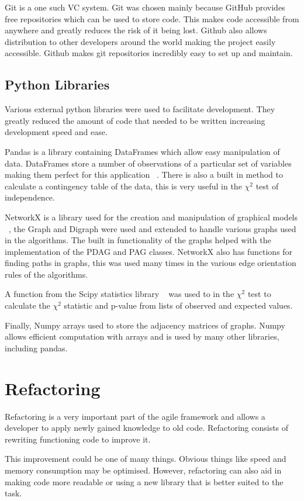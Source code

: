 \documentclass{UoYCSproject}
\begin{document}
Git is a one such VC system. Git was chosen mainly because GitHub provides free repositories which can be used to store code. This makes code accessible from anywhere and greatly reduces the risk of it being lost. Github also allows distribution to other developers around the world making the project easily accessible. Github makes git repositories incredibly easy to set up and maintain. 

\subsection{Python Libraries}
Various external python libraries were used to facilitate development. They greatly reduced the amount of code that needed to be written increasing development speed and ease.

Pandas is a library containing DataFrames which allow easy manipulation of data. DataFrames store a number of observations of a particular set of variables making them perfect for this application ~\parencite{pandas}. There is also a built in method to calculate a contingency table of the data, this is very useful in the $\chi^2$ test of independence.

NetworkX is a library used for the creation and manipulation of graphical models ~\parencite{networkx}, the Graph and Digraph were used and extended to handle various graphs used in the algorithms. The built in functionality of the graphs helped with the implementation of the PDAG and PAG classes. NetworkX also has functions for finding paths in graphs, this was used many times in the various edge orientation rules of the algorithms.

A function from the Scipy statistics library ~\parencite{scipy} was used to in the $\chi^2$ test to calculate the $\chi^2$ statistic and p-value from lists of observed and expected values.

Finally, Numpy arrays used to store the adjacency matrices of graphs. Numpy allows efficient computation with arrays and is used by many other libraries, including pandas. ~\parencite{numpy}  

\section{Refactoring}
Refactoring is a very important part of the agile framework and allows a developer to apply newly gained knowledge to old code. Refactoring consists of rewriting functioning code to improve it.

This improvement could be one of many things. Obvious things like speed and memory consumption may be optimised. However, refactoring can also aid in making code more readable or using a new library that is better suited to the task.
\end{document}
